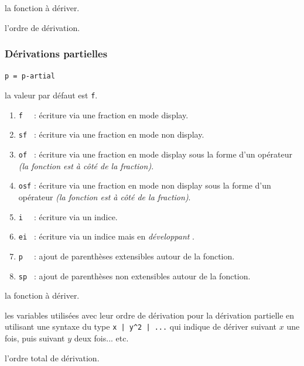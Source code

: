 \documentclass[12pt,a4paper]{book}
\theoremstyle{definition}
\newcommand\mwhyprefix[2]{%
	\texttt{#1 = #1-#2}%
}
\begin{document}
{{ la fonction à dériver.

 l'ordre de dérivation.


\subsubsection{Dérivations partielles}



 \hfill \mwhyprefix{p}{artial}

\IDoption{} la valeur par défaut est \verb+f+. 
\begin{enumerate}
	\item \verb+f  + : écriture via une fraction en mode display.

	\item \verb+sf + : écriture via une fraction en mode non display.

	\item \verb+of + : écriture via une fraction en mode display sous la forme d'un opérateur \emph{(la fonction est à côté de la fraction)}.

	\item \verb+osf+ : écriture via une fraction en mode non display sous la forme d'un opérateur \emph{(la fonction est à côté de la fraction)}.

	\medskip

	\item \verb+i  + : écriture via un indice.

	\item \verb+ei + : écriture via un indice mais en \emph{\og développant \fg}.

	\medskip

	\item \verb+p  + : ajout de parenthèses extensibles autour de la fonction.

	\item \verb+sp + : ajout de parenthèses non extensibles autour de la fonction.
\end{enumerate}


 la fonction à dériver.

 les variables utilisées avec leur ordre de dérivation pour la dérivation partielle en utilisant une syntaxe du type \verb+x | y^2 | ...+ qui indique de dériver suivant $x$ une fois, puis suivant $y$ deux fois... etc.

 l'ordre total de dérivation.




}}
\end{document}
